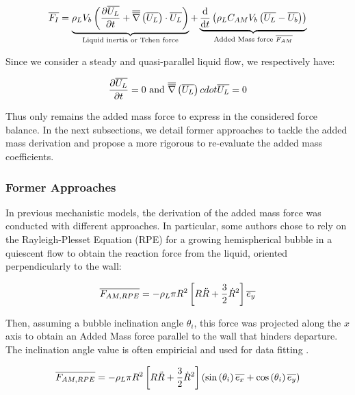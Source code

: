 \begin{equation}
\overline{F_{I}} = \underbrace{ \rho_{L}V_{b}\left( \frac{\partial{\overline{U_{L}}}}{\partial t}+\overline{\overline{\nabla}}\left({\overline{U_{L}} }\right)\cdot \overline{U_{L}} \right) }_{\text{Liquid inertia or Tchen force}} + \underbrace{ \frac{\mathrm{d}}{\mathrm{d}t}\left( \rho_{L}C_{AM}V_{b}\left( \overline{U_{L}}-\overline{U_{b}} \right) \right) }_{\text{Added Mass force } \overline{F_{AM}}}
\label{eq:F_inertia}
\end{equation}

Since we consider a steady and quasi-parallel liquid flow, we respectively have:

\begin{equation}
\dpartial{\vect{U_{L}} }{t}=0\ \text{and}\ \vecgrad{\vect{U_{L}} } cdot \vect{U_{L}}=0
\end{equation}

Thus only remains the added mass force to express in the considered force balance. In the next subsections, we detail former approaches to tackle the added mass derivation and propose a more rigorous to re-evaluate the added mass coefficients.


\subsubsection{Former Approaches}
\label{subsubsec:former_AM}

In previous mechanistic models, the derivation of the added mass force was conducted with different approaches. In particular, some authors chose to rely on the Rayleigh-Plesset Equation (RPE) for a growing hemispherical bubble in a quiescent flow to obtain the reaction force from the liquid, oriented perpendicularly to the wall:

\begin{equation}
\overline{F_{AM,RPE}}=- \rho_{L}\pi R^{2}\left[ R\ddot{R}+\frac{3}{2}\dot{R}^{2} \right]\overline{e_{y}}
\end{equation}

Then, assuming a bubble inclination angle $\theta_{i}$, this force was projected along the $x$ axis to obtain an Added Mass force parallel to the wall that hinders departure. The inclination angle value is often empiricial and used for data fitting \cite{zeng_unified_1993-1, colombo_prediction_2015, mazzocco_reassessed_2018, ren_development_2020}.

\begin{equation}
\overline{F_{AM,RPE}}=- \rho_{L}\pi R^{2}\left[ R\ddot{R}+\frac{3}{2}\dot{R}^{2} \right]\left( \mathrm{sin}\left( \theta_{i} \right)\overline{e_{x}} + \mathrm{cos}\left( \theta_{i} \right)\overline{e_{y}} \right)
\label{eq:AM_RPE}
\end{equation}


